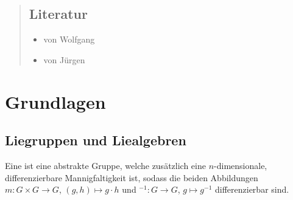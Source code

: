 
\newcommand{\fach}{Liegruppen}
\newcommand{\semester}{Sose 2016}
\newcommand{\homepage}{http://wwwmath.uni-muenster.de/42/arbeitsgruppen/ag-differentialgeometrie/prof-dr-christoph-boehm/vorlesung-liegruppen/}

\newcommand{\prof}{Prof.\ Dr.\ Christoph Böhm}
\publishers{}



\maketitle
\begin{abstract}

\section*{Literatur}
\begin{itemize}
	\item {} von Wolfgang \citeauthor{Ziller} \cite{Ziller}
	\item {} von Jürgen \citeauthor{Berndt} \cite{Berndt} 
\end{itemize}
\end{abstract}

\tableofcontents
\cleardoubleoddemptypage

\setcounter{page}{1}
\setcounter{footnote}{0}

\chapter{Grundlagen} %
\label{cha:grundlagen}

\section{Liegruppen und Liealgebren} %
\label{sec:1}
\begin{definition}[label=def:111,{name=[Liegruppe]}]
	Eine  ist eine abstrakte Gruppe, welche zusätzlich eine $n$-dimensionale, differenzierbare Mannigfaltigkeit ist, sodass die beiden Abbildungen 
	$m \colon G \times G \to G$, $(g,h) \mapsto g \cdot h$ und $^{-1} \colon G \to G$, $g \mapsto g^{-1}$ differenzierbar sind.
\end{definition}

